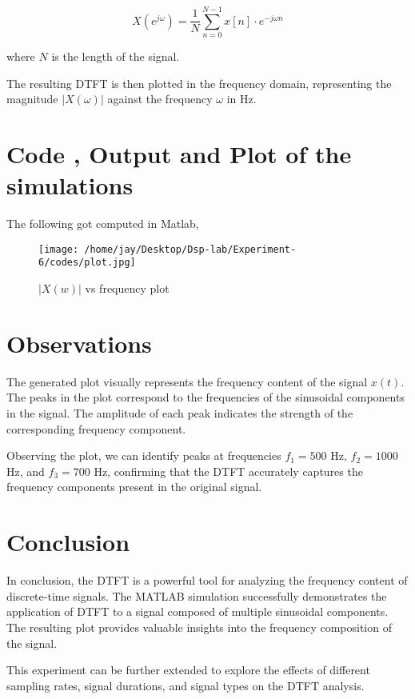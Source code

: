 \documentclass[journal,12pt,onecolumn]{IEEEtran}
\theoremstyle{remark}
\begin{document}
\[ X(e^{j\omega}) = \frac{1}{N} \sum_{n=0}^{N-1} x[n] \cdot e^{-j\omega n} \]

where \(N\) is the length of the signal.

The resulting DTFT is then plotted in the frequency domain, representing the magnitude \(|X(\omega)|\) against the frequency \(\omega\) in Hz.



\section{Code , Output and Plot of the simulations}

The following got computed in  Matlab,\\
\begin{figure}[ht] %
  \centering
  \texttt{[image: /home/jay/Desktop/Dsp-lab/Experiment-6/codes/plot.jpg]}
  \label{fig:your_label}
  \caption{$|X(w)|$ vs frequency plot}
\end{figure}
\clearpage
\section{Observations}

The generated plot visually represents the frequency content of the signal \(x(t)\). The peaks in the plot correspond to the frequencies of the sinusoidal components in the signal. The amplitude of each peak indicates the strength of the corresponding frequency component.

Observing the plot, we can identify peaks at frequencies \(f_1 = 500\) Hz, \(f_2 = 1000\) Hz, and \(f_3 = 700\) Hz, confirming that the DTFT accurately captures the frequency components present in the original signal.

\section{Conclusion}

In conclusion, the DTFT is a powerful tool for analyzing the frequency content of discrete-time signals. The MATLAB simulation successfully demonstrates the application of DTFT to a signal composed of multiple sinusoidal components. The resulting plot provides valuable insights into the frequency composition of the signal.

This experiment can be further extended to explore the effects of different sampling rates, signal durations, and signal types on the DTFT analysis.
\end{document}
